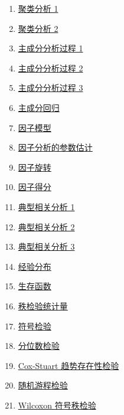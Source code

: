 \documentclass[11pt]{article}
\begin{document}
\begin{multicols}{2}
\begin{enumerate}
		\item \href{https://mp.weixin.qq.com/s/pTtkp4i4EjPA15xGr8bXEA}{聚类分析 1}	%
		\item \href{https://mp.weixin.qq.com/s/J3ihMUFLRRJ5KkOyOKtiFA}{聚类分析 2}	%
		\item \href{https://mp.weixin.qq.com/s/dx9GJ9kQ-NVPYYCpqlm6pA}{主成分分析过程 1}	%
		\item \href{https://mp.weixin.qq.com/s/AdbAE3etIOdXDnmScR4UMQ}{主成分分析过程 2}	%
		\item \href{https://mp.weixin.qq.com/s/5879fLJKlrF3LrfDHGMhzw}{主成分分析过程 3}	%
		\item \href{https://mp.weixin.qq.com/s/unHuA9mXDf0aOIKbYTbr4A}{主成分回归}	%
		\item \href{https://mp.weixin.qq.com/s/C3w_g1j-6nTyQ129zQWZAA}{因子模型}	%
		\item \href{https://mp.weixin.qq.com/s/8Cq9j8O-c4bslP_N1gBm8Q}{因子分析的参数估计}	%
		\item \href{https://mp.weixin.qq.com/s/nX6uaqPJtWbgAxG3XFsI-Q}{因子旋转}	%
		\item \href{https://mp.weixin.qq.com/s/MWurF0RGDhtAuTfsXsvQmg}{因子得分}	%
		\item \href{https://mp.weixin.qq.com/s/HbdGvDeefApfvO4dsfhD4g}{典型相关分析 1}	%
		\item \href{https://mp.weixin.qq.com/s/wAa52yRNmIcHhr-YRS1NZQ}{典型相关分析 2}	%
		\item \href{https://mp.weixin.qq.com/s/PsPXTRWgz6jtj3zHWkwABQ}{典型相关分析 3}	%
		\item \href{https://mp.weixin.qq.com/s/TRgaufutVZYmxeuhDQohfA}{经验分布}	%
		\item \href{https://mp.weixin.qq.com/s/JpTPeihiHc3xY2HH0AKTBQ}{生存函数}	%
		\item \href{https://mp.weixin.qq.com/s/7PoWquHk2n12GqdaonWrqg}{秩检验统计量}	%
		\item \href{https://mp.weixin.qq.com/s/CsrWq3P2rFlotI7GT2aHXQ}{符号检验}	%
		\item \href{https://mp.weixin.qq.com/s/m9sNzhNR9ceVNhxcTGikCQ}{分位数检验}	%
		\item \href{https://mp.weixin.qq.com/s/T9G1uStsdA8tplXqJ89fOg}{Cox-Stuart 趋势存在性检验}	%
		\item \href{https://mp.weixin.qq.com/s/ud6h02JBG7YjgxxDoN-bdA}{随机游程检验}	%
		\item \href{https://mp.weixin.qq.com/s/ZaWrv555RxjSlLNGL0g0VQ}{Wilcoxon 符号秩检验}	%

\end{enumerate}
\end{multicols}
\end{document}
